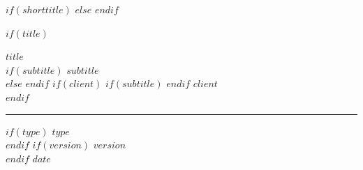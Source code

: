 \documentclass[
    $if(fontsize)$$fontsize$$else$10pt$endif$,
    $if(papersize)$$papersize$paper$else$letterpaper$endif$,
    titlepage,
    oneside,
    openright,
    $if(is_draft)$draft$else$final$endif$,
    article]{memoir}
\begin{document}
$if(shorttitle)$
$else$
$endif$



%
$if(title)$
    \newlength{\centeroffset}
    \thispagestyle{empty}
    \vspace*{1.75in}
    \begin{flushright}
        \ifxetex \mytitlefont \fi
        {\fontsize{22pt}{26pt}\textbf{$title$}}\\
        \ifpdftex
            \vspace*{0.7em}
        \fi
        \ifxetex
            \vspace*{1em}
        \fi
        $if(subtitle)$
            {\fontsize{18pt}{20pt}\textbf{$subtitle$}}\\
        $else$
            \vspace*{0.0em}
        $endif$
        $if(client)$
            $if(subtitle)$
                \vspace*{0.7em}
            $endif$
            {\fontsize{18pt}{20pt}\textbf{$client$}}\\
        $endif$

        \vspace*{0.7em}
        \noindent\textcolor{DimGray}{\rule{\textwidth}{1pt}}
        \vspace*{0.0em}

        $if(type)$
            {\fontsize{16pt}{20pt}\textrm{$type$}}\\[0.7em]
        $endif$
        $if(version)$
            \vspace*{-0.2em}
            {\fontsize{12pt}{16pt}\textrm{\space $version$}}\\
            \vspace*{0.7em}
        $endif$
        {\fontsize{12pt}{16pt}\textrm{$date$}}\\[0.7em]


\end{flushright}
\end{document}
